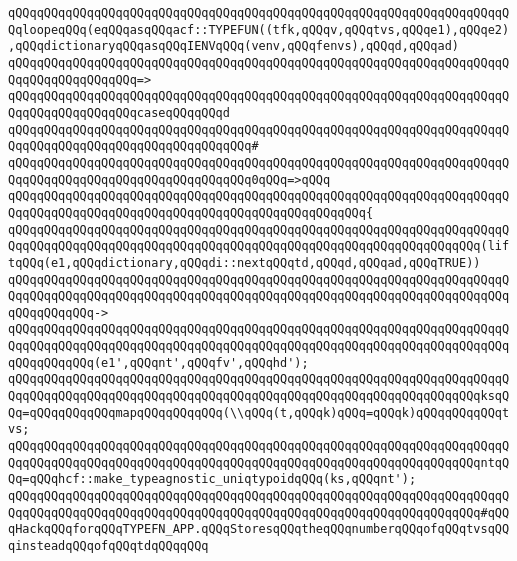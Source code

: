 \newline
\verb|qQQqqQQqqQQqqQQqqQQqqQQqqQQqqQQqqQQqqQQqqQQqqQQqqQQqqQQqqQQqqQQqqQQqqQQqloopeqQQq(eqQQqasqQQqacf::TYPEFUN((tfk,qQQqv,qQQqtvs,qQQqe1),qQQqe2),qQQqdictionaryqQQqasqQQqIENVqQQq(venv,qQQqfenvs),qQQqd,qQQqad)|\newline
\verb|qQQqqQQqqQQqqQQqqQQqqQQqqQQqqQQqqQQqqQQqqQQqqQQqqQQqqQQqqQQqqQQqqQQqqQQqqQQqqQQqqQQqqQQq=>|\newline
\verb|qQQqqQQqqQQqqQQqqQQqqQQqqQQqqQQqqQQqqQQqqQQqqQQqqQQqqQQqqQQqqQQqqQQqqQQqqQQqqQQqqQQqqQQqcaseqQQqqQQqd|\newline
\verb|qQQqqQQqqQQqqQQqqQQqqQQqqQQqqQQqqQQqqQQqqQQqqQQqqQQqqQQqqQQqqQQqqQQqqQQqqQQqqQQqqQQqqQQqqQQqqQQqqQQqqQQq#|\newline
\verb|qQQqqQQqqQQqqQQqqQQqqQQqqQQqqQQqqQQqqQQqqQQqqQQqqQQqqQQqqQQqqQQqqQQqqQQqqQQqqQQqqQQqqQQqqQQqqQQqqQQqqQQq0qQQq=>qQQq|\newline
\verb|qQQqqQQqqQQqqQQqqQQqqQQqqQQqqQQqqQQqqQQqqQQqqQQqqQQqqQQqqQQqqQQqqQQqqQQqqQQqqQQqqQQqqQQqqQQqqQQqqQQqqQQqqQQqqQQqqQQqqQQq{|\newline
\verb|qQQqqQQqqQQqqQQqqQQqqQQqqQQqqQQqqQQqqQQqqQQqqQQqqQQqqQQqqQQqqQQqqQQqqQQqqQQqqQQqqQQqqQQqqQQqqQQqqQQqqQQqqQQqqQQqqQQqqQQqqQQqqQQqqQQqqQQq(liftqQQq(e1,qQQqdictionary,qQQqdi::nextqQQqtd,qQQqd,qQQqad,qQQqTRUE))|\newline
\verb|qQQqqQQqqQQqqQQqqQQqqQQqqQQqqQQqqQQqqQQqqQQqqQQqqQQqqQQqqQQqqQQqqQQqqQQqqQQqqQQqqQQqqQQqqQQqqQQqqQQqqQQqqQQqqQQqqQQqqQQqqQQqqQQqqQQqqQQqqQQqqQQqqQQqqQQq->|\newline
\verb|qQQqqQQqqQQqqQQqqQQqqQQqqQQqqQQqqQQqqQQqqQQqqQQqqQQqqQQqqQQqqQQqqQQqqQQqqQQqqQQqqQQqqQQqqQQqqQQqqQQqqQQqqQQqqQQqqQQqqQQqqQQqqQQqqQQqqQQqqQQqqQQqqQQqqQQq(e1',qQQqnt',qQQqfv',qQQqhd');|\newline
\newline
\verb|qQQqqQQqqQQqqQQqqQQqqQQqqQQqqQQqqQQqqQQqqQQqqQQqqQQqqQQqqQQqqQQqqQQqqQQqqQQqqQQqqQQqqQQqqQQqqQQqqQQqqQQqqQQqqQQqqQQqqQQqqQQqqQQqqQQqqQQqksqQQq=qQQqqQQqqQQqmapqQQqqQQqqQQq(\\qQQq(t,qQQqk)qQQq=qQQqk)qQQqqQQqqQQqtvs;|\newline
\newline
\verb|qQQqqQQqqQQqqQQqqQQqqQQqqQQqqQQqqQQqqQQqqQQqqQQqqQQqqQQqqQQqqQQqqQQqqQQqqQQqqQQqqQQqqQQqqQQqqQQqqQQqqQQqqQQqqQQqqQQqqQQqqQQqqQQqqQQqqQQqntqQQq=qQQqhcf::make_typeagnostic_uniqtypoidqQQq(ks,qQQqnt');|\newline
\newline
\verb|qQQqqQQqqQQqqQQqqQQqqQQqqQQqqQQqqQQqqQQqqQQqqQQqqQQqqQQqqQQqqQQqqQQqqQQqqQQqqQQqqQQqqQQqqQQqqQQqqQQqqQQqqQQqqQQqqQQqqQQqqQQqqQQqqQQqqQQq#qQQqHackqQQqforqQQqTYPEFN_APP.qQQqStoresqQQqtheqQQqnumberqQQqofqQQqtvsqQQqinsteadqQQqofqQQqtdqQQqqQQq|\newline
